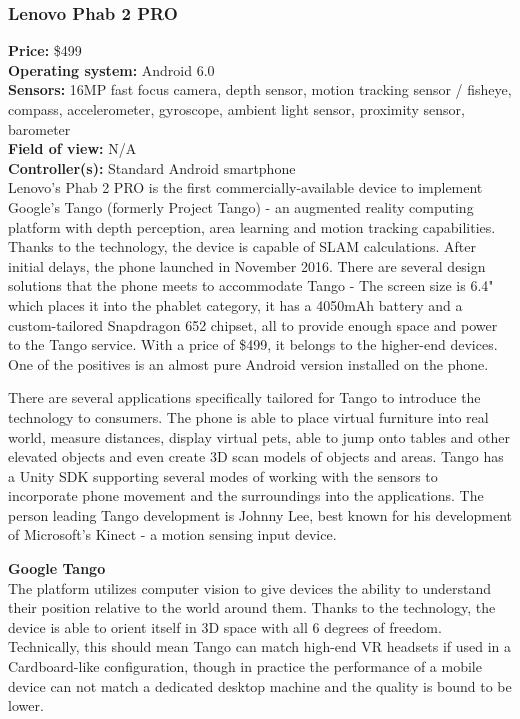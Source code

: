 \documentclass[12pt, a4paper]{article}
\begin{document}
\subsubsection{Lenovo Phab 2 PRO}
\vspace*{-5mm}
\textbf{Price:} \$499\\
\textbf{Operating system:} Android 6.0\\
\textbf{Sensors:} 16MP fast focus camera, depth sensor, motion tracking sensor / fisheye, compass, accelerometer, gyroscope, ambient light sensor, proximity sensor, barometer\\
\textbf{Field of view:} N/A \\
\textbf{Controller(s):} Standard Android smartphone \bigskip \\
Lenovo’s Phab 2 PRO is the first commercially-available device to implement Google’s Tango (formerly Project Tango) - an augmented reality computing platform with depth perception, area learning and motion tracking capabilities. Thanks to the technology, the device is capable of SLAM calculations. After initial delays, the phone launched in November 2016. There are several design solutions that the phone meets to accommodate Tango - The screen size is 6.4" which places it into the phablet category, it has a 4050mAh battery and a custom-tailored Snapdragon 652 chipset, all to provide enough space and power to the Tango service. With a price of \$499, it belongs to the higher-end devices. One of the positives is an almost pure Android version installed on the phone.

There are several applications specifically tailored for Tango to introduce the technology to consumers. The phone is able to place virtual furniture into real world, measure distances, display virtual pets, able to jump onto tables and other elevated objects and even create 3D scan models of objects and areas. Tango has a Unity SDK supporting several modes of working with the sensors to incorporate phone movement and the surroundings into the applications. The person leading Tango development is Johnny Lee, best known for his development of Microsoft’s Kinect - a motion sensing input device.


\textbf{Google Tango}\\
The platform utilizes computer vision to give devices the ability to understand their position relative to the world around them. Thanks to the technology, the device is able to orient itself in 3D space with all 6 degrees of freedom. Technically, this should mean Tango can match high-end VR headsets if used in a Cardboard-like configuration, though in practice the performance of a mobile device can not match a dedicated desktop machine and the quality is bound to be lower.
\end{document}
